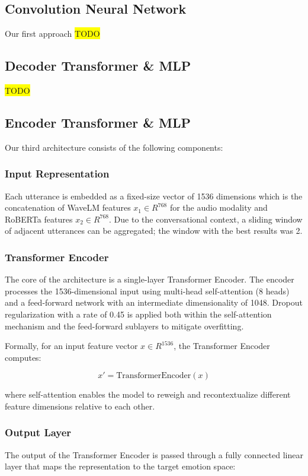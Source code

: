 \documentclass{article}
\begin{document}
\subsection{Convolution Neural Network}
Our first approach
\colorbox{yellow}{TODO}\\

\subsection{Decoder Transformer \& MLP}
\colorbox{yellow}{TODO}\\

\subsection{Encoder Transformer \& MLP}
Our third architecture consists of the following components:

\subsubsection{Input Representation}
Each utterance is embedded as a fixed-size vector of 1536 dimensions which is the concatenation of WaveLM features $x_1 \in R^{768}$ for the audio modality and RoBERTa features $x_2 \in R^{768}$. Due to the conversational context, a sliding window of adjacent utterances can be aggregated; the window with the best results was 2.

\subsubsection{Transformer Encoder}
The core of the architecture is a single-layer Transformer Encoder. The encoder processes the 1536-dimensional input using multi-head self-attention (8 heads) and a feed-forward network with an intermediate dimensionality of 1048. Dropout regularization with a rate of 0.45 is applied both within the self-attention mechanism and the feed-forward sublayers to mitigate overfitting.

Formally, for an input feature vector $ x \in {R}^{1536} $, the Transformer Encoder computes:

$$ x' = \text{TransformerEncoder}(x) $$

where self-attention enables the model to reweigh and recontextualize different feature dimensions relative to each other.

\subsubsection{Output Layer}
The output of the Transformer Encoder is passed through a fully connected linear layer that maps the representation to the target emotion space:
\end{document}
